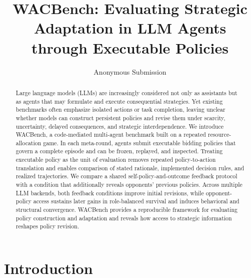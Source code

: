 \documentclass[letterpaper]{article} %
\title{WACBench: Evaluating Strategic Adaptation in LLM Agents through Executable Policies}
\author{Anonymous Submission}
\begin{document}
\maketitle


\begin{abstract}
Large language models (LLMs) are increasingly considered not only as assistants but as agents that may formulate and execute consequential strategies. Yet existing benchmarks often emphasize isolated actions or task completion, leaving unclear whether models can construct persistent policies and revise them under scarcity, uncertainty, delayed consequences, and strategic interdependence. We introduce WACBench, a code-mediated multi-agent benchmark built on a repeated resource-allocation game. In each meta-round, agents submit executable bidding policies that govern a complete episode and can be frozen, replayed, and inspected. Treating executable policy as the unit of evaluation removes repeated policy-to-action translation and enables comparison of stated rationale, implemented decision rules, and realized trajectories. We compare a shared self-policy-and-outcome feedback protocol with a condition that additionally reveals opponents' previous policies. Across multiple LLM backends, both feedback conditions improve initial revisions, while opponent-policy access sustains later gains in role-balanced survival and induces behavioral and structural convergence. WACBench provides a reproducible framework for evaluating policy construction and adaptation and reveals how access to strategic information reshapes policy revision.
\end{abstract}


\begin{links}
\end{links}

\section{Introduction}
\end{document}
